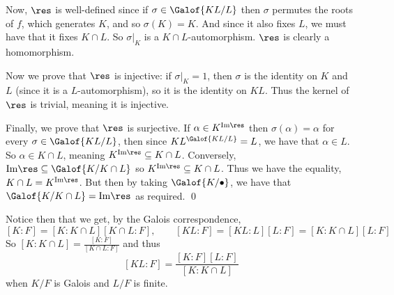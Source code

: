 Now, $\res$ is well-defined since if $\sigma\in\Galof{KL/L}$ then $\sigma$ permutes the roots of $f$, which generates $K$, and so $\sigma(K)=K$.
And since it also fixes $L$, we must have that it fixes $K\cap L$.
So $\sigma\bigl|_K$ is a $K\cap L$-automorphism.
$\res$ is clearly a homomorphism.

Now we prove that $\res$ is injective: if $\sigma\bigl|_K=1$, then $\sigma$ is the identity on $K$ and $L$ (since it is a $L$-automorphism), so it is the identity on $KL$.
Thus the kernel of $\res$ is trivial, meaning it is injective.

Finally, we prove that $\res$ is surjective.
If $\alpha\in K^{{\rm Im}\res}$ then $\sigma(\alpha)=\alpha$ for every $\sigma\in\Galof{KL/L}$, then since $KL^{\Galof{KL/L}}=L$, we have that $\alpha\in L$.
So $\alpha\in K\cap L$, meaning $K^{{\rm Im}\res}\subseteq K\cap L$.
Conversely, ${\rm Im}\res\subseteq\Galof{K/K\cap L}$ so $K^{{\rm Im}\res}\subseteq K\cap L$.
Thus we have the equality, $K\cap L=K^{{\rm Im}\res}$.
But then by taking $\Galof{K/\bullet}$, we have that $\Galof{K/K\cap L}={\rm Im}\res$ as required.
\qed

Notice then that we get, by the Galois correspondence,
$$ [K:F] = [K:K\cap L][K\cap L:F],\qquad [KL:F] = [KL:L][L:F] = [K:K\cap L][L:F] $$
So $[K:K\cap L]=\frac{[K:F]}{[K\cap L:F]}$ and thus
$$ [KL:F] = \frac{[K:F][L:F]}{[K:K\cap L]} $$
when $K/F$ is Galois and $L/F$ is finite.

